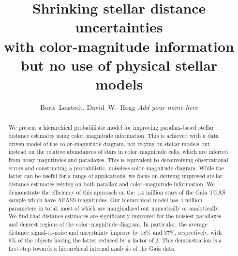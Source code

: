 \documentclass[manuscript, letterpaper]{aastex6}
\begin{document}
 
\title{Shrinking stellar distance uncertainties\\
 with color-magnitude information \\
  but no use of physical stellar models}
  


\author{
	Boris~Leistedt,
	David~W.~Hogg
	\textit{Add your name here}
	}


  

\begin{abstract}
We present a hierarchical probabilistic model for improving parallax-based stellar distance estimates using color--magnitude information. 
This is achieved with a data driven model of the color--magnitude diagram, not relying on stellar models but instead on the relative abundances of stars in color--magnitude cells, which are inferred from noisy magnitudes and parallaxes.
This is equivalent to deconvolving observational errors and constructing a probabilistic, noiseless color--magnitude diagram.
While the latter can be useful for a range of applications, we focus on deriving improved stellar distance estimates relying on both parallax and color--magnitude information.
We demonstrate the efficiency of this approach on the 1.4 million stars of the Gaia TGAS sample which have APASS magnitudes.
Our hierarchical model has 4 million parameters in total, most of which are marginalized out numerically or analytically.
We find that distance estimates are significantly improved for the noisiest parallaxes and densest regions of the color--magnitude diagram. 
In particular, the average distance signal-to-noise and uncertainty improve by 18\% and 37\%, respectively, with 9\% of the objects having the latter reduced by a factor of 2. 
This demonstration is a first step towards a hierarchical internal analysis of the Gaia data.
\end{abstract}

\end{document}

